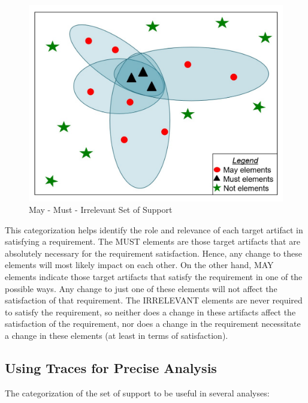 \begin{figure}[htb]
\includegraphics[width=\columnwidth]{images/may_must.pdf}
\caption{May - Must - Irrelevant Set of Support}\label{fig:maymust}
\end{figure}

This categorization helps identify the role and relevance of each target artifact in satisfying a requirement. The MUST elements are those target artifacts that are absolutely necessary for the requirement satisfaction. Hence, any change to these elements will most likely impact on each other. On the other hand, MAY elements indicate those target artifacts that satisfy the requirement in one of the possible ways.  Any change to just one of these elements will not affect the satisfaction of that requirement. The IRRELEVANT elements are never required to satisfy the requirement, so neither does a change in these artifacts affect the satisfaction of the requirement, nor does a change in the requirement necessitate a change in these elements (at least in terms of satisfaction).


\subsection{Using Traces for Precise Analysis}

The categorization of the set of support to be useful in several analyses:

